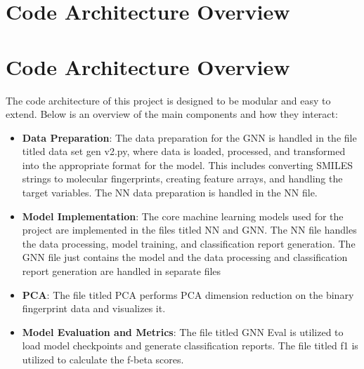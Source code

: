 \documentclass[10pt,twocolumn]{article}
\begin{document}
\section{Code Architecture Overview}
\section*{Code Architecture Overview}

The code architecture of this project is designed to be modular and easy to extend. Below is an overview of the main components and how they interact:

\begin{itemize}
    \item \textbf{Data Preparation}: 
    The data preparation for the GNN is handled in the file titled data set gen v2.py, where data is loaded, processed, and transformed into the appropriate format for the model. This includes converting SMILES strings to molecular fingerprints, creating feature arrays, and handling the target variables. The NN data preparation is handled in the NN file. 
    
    \item \textbf{Model Implementation}: 
    The core machine learning models used for the project are implemented in the files titled NN and GNN. The NN file handles the data processing, model training, and classification report generation. The GNN file just contains the model and the data processing and classification report generation are handled in separate files

    \item \textbf{PCA}: 
    The file titled PCA performs PCA dimension reduction on the binary fingerprint data and visualizes it. 

    \item \textbf{Model Evaluation and Metrics}: 
    The file titled GNN Eval is utilized to load model checkpoints and generate classification reports. The file titled f1 is utilized to calculate the f-beta scores. 

\end{itemize}



\printbibliography
\end{document}
